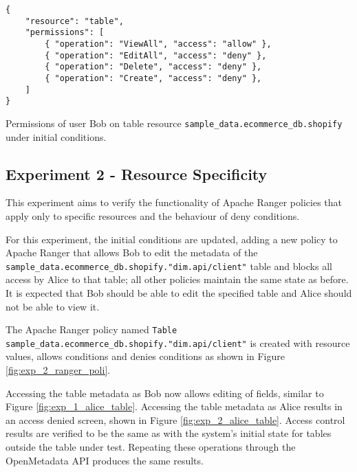 \begin{listing}

\begin{verbatim}
{
    "resource": "table",
    "permissions": [
        { "operation": "ViewAll", "access": "allow" },
        { "operation": "EditAll", "access": "deny" },
        { "operation": "Delete", "access": "deny" },
        { "operation": "Create", "access": "deny" },
    ]
}
\end{verbatim}

\caption{Permissions of user Bob on table resource \texttt{sample_data.ecommerce_db.shopify} under initial conditions.}

\label{listing:exp_1_perms}

\end{listing}

\subsection{Experiment 2 - Resource Specificity}

This experiment aims to verify the functionality of Apache Ranger policies that apply only to specific resources and the behaviour of deny conditions.

For this experiment, the initial conditions are updated, adding a new policy to Apache Ranger that allows Bob to edit the metadata of the \texttt{sample_data.ecommerce_db.shopify."dim.api/client"} table and blocks all access by Alice to that table; all other policies maintain the same state as before. It is expected that Bob should be able to edit the specified table and Alice should not be able to view it. 

The Apache Ranger policy named \texttt{Table sample_data.ecommerce_db.shopify."dim.api/client"} is created with resource values, allows conditions and denies conditions as shown in Figure \ref{fig:exp_2_ranger_poli}. 

Accessing the table metadata as Bob now allows editing of fields, similar to Figure \ref{fig:exp_1_alice_table}. Accessing the table metadata as Alice results in an access denied screen, shown in Figure \ref{fig:exp_2_alice_table}. Access control results are verified to be the same as with the system's initial state for tables outside the table under test. Repeating these operations through the OpenMetadata API produces the same results.

